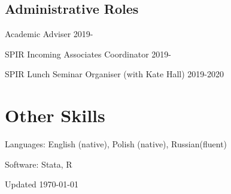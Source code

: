 \documentclass[12pt,letterpaper]{report}
\newcommand{\listitemspace}{0.25em}
\renewenvironment{itemize}
{\begin{list}{}{\setlength{\leftmargin}{0em}
                \setlength{\parskip}{0em}
                \setlength{\itemsep}{\listitemspace}
                \setlength{\parsep}{\listitemspace}}}
{\end{list}}
\begin{document}
\subsection*{Administrative Roles}
\begin{itemize}
	\item Academic Adviser 2019- 
	\item SPIR Incoming Associates Coordinator 2019-
	\item SPIR Lunch Seminar Organiser (with Kate Hall) 2019-2020
\end{itemize}

\section*{Other Skills}


\begin{itemize}
	\item Languages: English (native), Polish (native), Russian(fluent)
	\item Software: Stata, R

	
\end{itemize}

\begin{center}
	\vfill
	Updated \monthyeardate\today
\end{center}
\end{document}
